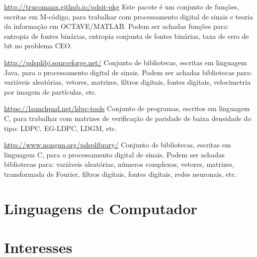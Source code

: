 \documentclass[11pt,a4paper,sans]{moderncv} %
\begin{document}
			{\url{http://trucomanx.github.io/pdsit-pkg}}
			{}{}
			{Este pacote é um conjunto de funções, escritas em M-código, para trabalhar 
			com processamento digital de sinais e teoria da 
			informação em OCTAVE/MATLAB. Podem ser achadas 
			funções para: entropia de fontes binárias, 
			entropia conjunta de fontes binárias, 
			taxa de erro de bit no problema CEO. }
			
			{\url{http://pdsplibj.sourceforge.net/}}
			{}{}
			{Conjunto de bibliotecas, escritas em linguagem Java, para 
			o processamento digital de sinais. Podem ser achadas 
			bibliotecas para: variáveis aleatórias, 
			vetores, matrizes, filtros 
			digitais, fontes digitais, velocimetria por imagem de partículas, etc.}

			{\url{https://launchpad.net/ldpc-tools}}
			{}{}
			{Conjunto de programas, escritos em linguagem C, para 
			trabalhar com matrizes de verificação de paridade 
			de baixa densidade do tipo: LDPC, EG-LDPC, LDGM, etc.}
			

			{\url{http://www.nongnu.org/pdsplibrary/}}
			{}{}
			{Conjunto de bibliotecas, escritas em linguagem C, para 
			o processamento digital de sinais. Podem ser achadas 
			bibliotecas para: variáveis aleatórias, números complexos, 
			vetores, matrizes, transformada de Fourier, filtros 
			digitais, fontes digitais, redes neuronais, etc.}


\section{Linguagens de Computador}




\section{Interesses}

\renewcommand{\listitemsymbol}{-~} %
\end{document}

